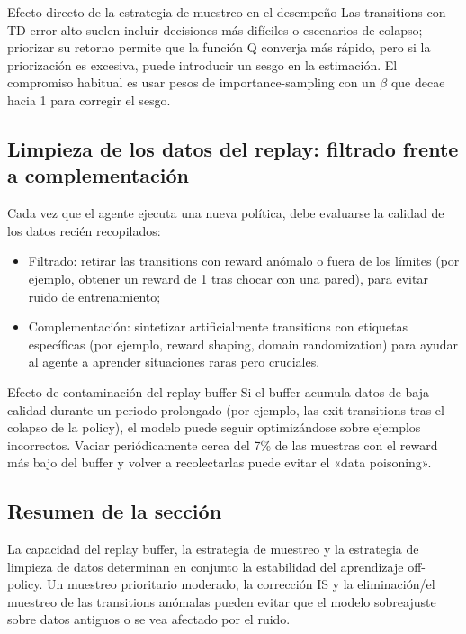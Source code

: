 \documentclass[a4paper]{article}
\begin{document}
\begin{knowledgebox}{Efecto directo de la estrategia de muestreo en el desempeño}
Las transitions con TD error alto suelen incluir decisiones más difíciles o escenarios de colapso; priorizar su retorno permite que la función Q converja más rápido, pero si la priorización es excesiva, puede introducir un sesgo en la estimación. El compromiso habitual es usar pesos de importance-sampling con un $\beta$ que decae hacia 1 para corregir el sesgo.
\end{knowledgebox}

\subsection{Limpieza de los datos del replay: filtrado frente a complementación}

Cada vez que el agente ejecuta una nueva política, debe evaluarse la calidad de los datos recién recopilados:

\begin{itemize}
    \item Filtrado: retirar las transitions con reward anómalo o fuera de los límites (por ejemplo, obtener un reward de 1 tras chocar con una pared), para evitar ruido de entrenamiento;
    \item Complementación: sintetizar artificialmente transitions con etiquetas específicas (por ejemplo, reward shaping, domain randomization) para ayudar al agente a aprender situaciones raras pero cruciales.
\end{itemize}

\begin{warningbox}{Efecto de contaminación del replay buffer}
Si el buffer acumula datos de baja calidad durante un periodo prolongado (por ejemplo, las exit transitions tras el colapso de la policy), el modelo puede seguir optimizándose sobre ejemplos incorrectos. Vaciar periódicamente cerca del 7\% de las muestras con el reward más bajo del buffer y volver a recolectarlas puede evitar el «data poisoning».
\end{warningbox}

\subsection{Resumen de la sección}

La capacidad del replay buffer, la estrategia de muestreo y la estrategia de limpieza de datos determinan en conjunto la estabilidad del aprendizaje off-policy. Un muestreo prioritario moderado, la corrección IS y la eliminación/el muestreo de las transitions anómalas pueden evitar que el modelo sobreajuste sobre datos antiguos o se vea afectado por el ruido.
\end{document}
